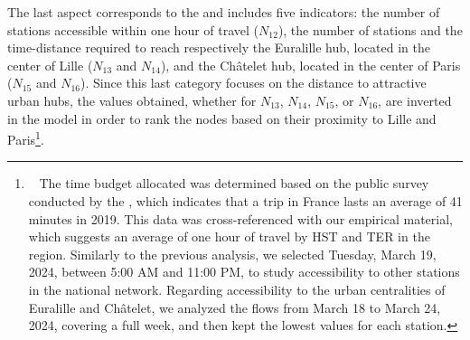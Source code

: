 \begin{refsegment}
The last aspect corresponds to the  and includes five indicators: the number of stations accessible within one hour of travel (\(N_{12}\)), the number of stations and the time-distance required to reach respectively the Euralille hub, located in the center of Lille (\(N_{13}\) and \(N_{14}\)), and the Châtelet hub, located in the center of Paris (\(N_{15}\) and \(N_{16}\)). Since this last category focuses on the distance to attractive urban hubs, the values obtained, whether for \(N_{13}\), \(N_{14}\), \(N_{15}\), or \(N_{16}\), are inverted in the model in order to rank the nodes based on their proximity to Lille and Paris\footnote{~
    The time budget allocated was determined based on the public survey conducted by the \textcolor{blue}{\textcite{ministere_de_la_transition_ecologique_et_de_la_cohesion_des_territoires_mobilite_2023}}, which indicates that a  trip in France lasts an average of 41 minutes in 2019. This data was cross-referenced with our empirical material, which suggests an average of one hour of travel by \acrshort{HST} and \acrshort{TER} in the region. Similarly to the previous analysis, we selected Tuesday, March 19, 2024, between 5:00 AM and 11:00 PM, to study accessibility to other stations in the national network. Regarding accessibility to the urban centralities of Euralille and Châtelet, we analyzed the flows from March 18 to March 24, 2024, covering a full week, and then kept the lowest values for each station.
}.%


\end{refsegment}
